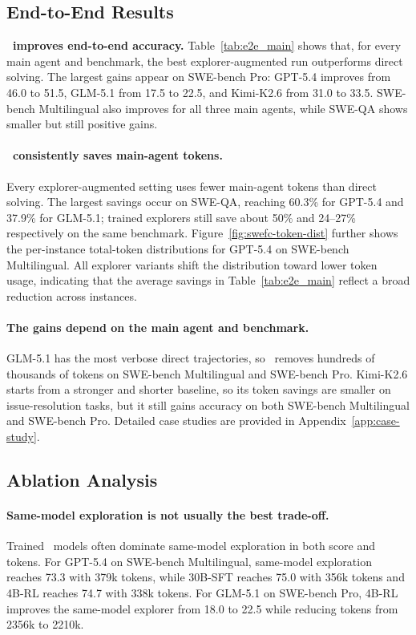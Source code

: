 \documentclass{llmxive}
\providecommand{\approach}{~}
\begin{document}
\subsection{End-to-End Results}
\label{sec:e2e-results}
\vspace{-1mm}
\textbf{\approach improves end-to-end accuracy.}
Table~\ref{tab:e2e_main} shows that, for every main agent and benchmark, the best explorer-augmented run outperforms direct solving.
The largest gains appear on SWE-bench Pro: GPT-5.4 improves from 46.0 to 51.5, GLM-5.1 from 17.5 to 22.5, and Kimi-K2.6 from 31.0 to 33.5.
SWE-bench Multilingual also improves for all three main agents, while SWE-QA shows smaller but still positive gains.


\paragraph{\approach consistently saves main-agent tokens.}
Every explorer-augmented setting uses fewer main-agent tokens than direct solving.
The largest savings occur on SWE-QA, reaching 60.3\% for GPT-5.4 and 37.9\% for GLM-5.1; trained explorers still save about 50\% and 24--27\% respectively on the same benchmark.
Figure~\ref{fig:swefc-token-dist} further shows the per-instance total-token distributions for GPT-5.4 on SWE-bench Multilingual.
All explorer variants shift the distribution toward lower token usage, indicating that the average savings in Table~\ref{tab:e2e_main} reflect a broad reduction across instances.


\paragraph{The gains depend on the main agent and benchmark.}
GLM-5.1 has the most verbose direct trajectories, so \approach removes hundreds of thousands of tokens on SWE-bench Multilingual and SWE-bench Pro.
Kimi-K2.6 starts from a stronger and shorter baseline, so its token savings are smaller on issue-resolution tasks, but it still gains accuracy on both SWE-bench Multilingual and SWE-bench Pro.
Detailed case studies are provided in Appendix~\ref{app:case-study}.


\subsection{Ablation Analysis}
\label{sec:e2e-ablation}

\paragraph{Same-model exploration is not usually the best trade-off.}
Trained \approach models often dominate same-model exploration in both score and tokens.
For GPT-5.4 on SWE-bench Multilingual, same-model exploration reaches 73.3 with 379k tokens, while 30B-SFT reaches 75.0 with 356k tokens and 4B-RL reaches 74.7 with 338k tokens.
For GLM-5.1 on SWE-bench Pro, 4B-RL improves the same-model explorer from 18.0 to 22.5 while reducing tokens from 2356k to 2210k.
\end{document}
